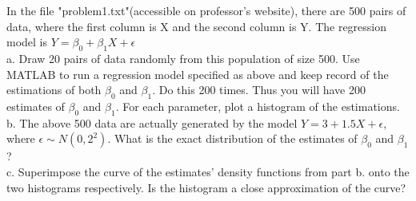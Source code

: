 \documentclass[12pt]{article}
\begin{document}
 {
 In the file "problem1.txt"(accessible on professor's website),
 there are 500 pairs of data, where the first column is X and
 the second column is Y. The regression model is
 $Y=\beta_0+\beta_1X+\epsilon$\\
 a. Draw 20 pairs of data randomly from this population of size 500.
 Use MATLAB to run a regression model specified as above and keep
 record of the estimations of both $\beta_0$ and $\beta_1$. Do this
 200 times. Thus you will have 200 estimates of $\beta_0$ and $\beta_1$.
 For each parameter, plot a histogram of the estimations.\\
 b. The above 500 data are actually generated by the model
 $Y=3+1.5X+\epsilon$, where $\epsilon\sim N(0,2^2)$. What is the
 exact distribution of the estimates of $\beta_0$ and $\beta_1$?\\
 c. Superimpose the curve of the estimates' density functions from
 part b. onto the two histograms respectively. Is the histogram a
 close approximation of the curve?
   }
\end{document}
